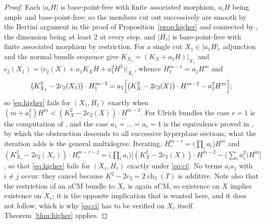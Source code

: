 \documentclass[11pt]{amsart}
\theoremstyle{remark}
\theoremstyle{definition}
\begin{document}
\begin{proof}
Each $|a_iH|$ is base-point-free with finite associated morphism, $a_iH$ being ample and base-point-free; so the members cut out successively are smooth by the Bertini argument in the proof of Proposition~\ref{prop:higher} and connected by \cite[III.7.9]{Ha}, the dimension being at least $2$ at every step, and $|H_r|$ is base-point-free with finite associated morphism by restriction. For a single cut $X_1\in|a_1H|$, adjunction and the normal bundle sequence give $K_{X_1}=(K_X+a_1H)|_{X_1}$ and $c_2(X_1)=\bigl(c_2(X)+a_1K_XH+a_1^2H^2\bigr)|_{X_1}$, whence $H_1^{m-1}=a_1H^m$ and
\[
\bigl(K_{X_1}^2-2c_2(X_1)\bigr)\cdot H_1^{m-3}=a_1\Bigl[\bigl(K_X^2-2c_2(X)\bigr)\cdot H^{m-2}-a_1^2H^m\Bigr];
\]
so \eqref{eq:higher} fails for $(X_1,H_1)$ exactly when $(m+a_1^2)H^m<(K_X^2-2c_2(X))\cdot H^{m-2}$. For Ulrich bundles the case $r=1$ is the computation of \cite[\S4]{Lo}, and the case $a_1=\dots=a_r=1$ is the equivalence proved in \cite[Lem.~3.1]{Lo}, by which the obstruction descends to all successive hyperplane sections; what the iteration adds is the general multidegree. Iterating, $H_r^{m-r}=\bigl(\prod_ia_i\bigr)H^m$ and $(K_{X_r}^2-2c_2(X_r))\cdot H_r^{m-r-2}=\bigl(\prod_ia_i\bigr)\bigl[(K_X^2-2c_2(X))\cdot H^{m-2}-\bigl(\sum_ia_i^2\bigr)H^m\bigr]$, so that \eqref{eq:higher} fails for $(X_r,H_r)$ exactly under \eqref{eq:ci}. No terms $a_ia_j$ with $i\ne j$ occur: they cancel because $K^2-2c_2=2\operatorname{ch}_2(T)$ is additive. Note also that the restriction of an aCM bundle to $X_r$ is again aCM, so existence on $X$ implies existence on $X_r$; it is the opposite implication that is wanted here, and it does not follow, which is why \eqref{eq:ci} has to be verified on $X_r$ itself. Theorem~\ref{thm:higher} applies.
\end{proof}
\end{document}
